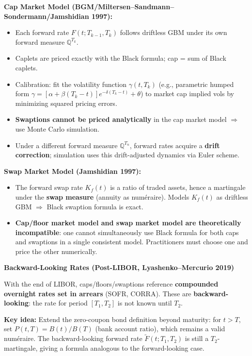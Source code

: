 \documentclass[12pt,a4paper]{article}
\begin{document}
\vspace{0.3em}
\noindent\textbf{Cap Market Model (BGM/Miltersen--Sandmann--Sondermann/Jamshidian 1997):}
\begin{itemize}
    \item Each forward rate $F(t;T_{k-1},T_k)$ follows driftless GBM under its own forward measure $\mathbb{Q}^{T_k}$.
    \item Caplets are priced exactly with the Black formula; cap = sum of Black caplets.
    \item Calibration: fit the volatility function $\gamma(t,T_k)$ (e.g., parametric humped form $\gamma = [\alpha + \beta(T_k-t)]e^{-\delta(T_k-t)} + \theta$) to market cap implied vols by minimizing squared pricing errors.
    \item \textbf{Swaptions cannot be priced analytically} in the cap market model $\Rightarrow$ use Monte Carlo simulation.
    \item Under a different forward measure $\mathbb{Q}^{T_n}$, forward rates acquire a \textbf{drift correction}; simulation uses this drift-adjusted dynamics via Euler scheme.
\end{itemize}

\vspace{0.3em}
\noindent\textbf{Swap Market Model (Jamshidian 1997):}
\begin{itemize}
    \item The forward swap rate $K_f(t)$ is a ratio of traded assets, hence a martingale under the \textbf{swap measure} (annuity as numéraire). Models $K_f(t)$ as driftless GBM $\Rightarrow$ Black swaption formula is exact.
    \item \textbf{Cap/floor market model and swap market model are theoretically incompatible}: one cannot simultaneously use Black formula for both caps and swaptions in a single consistent model. Practitioners must choose one and price the other numerically.
\end{itemize}

\vspace{0.5em}
\noindent\textbf{Backward-Looking Rates (Post-LIBOR, Lyashenko--Mercurio 2019)}

\vspace{0.3em}
\noindent With the end of LIBOR, caps/floors/swaptions reference \textbf{compounded overnight rates set in arrears} (SOFR, CORRA). These are \textbf{backward-looking}: the rate for period $[T_1,T_2]$ is not known until $T_2$.

\vspace{0.3em}
\noindent\textbf{Key idea:} Extend the zero-coupon bond definition beyond maturity: for $t > T$, set $P(t,T) = B(t)/B(T)$ (bank account ratio), which remains a valid numéraire. The backward-looking forward rate $\tilde{F}(t;T_1,T_2)$ is still a $T_2$-martingale, giving a formula analogous to the forward-looking case.
\end{document}
